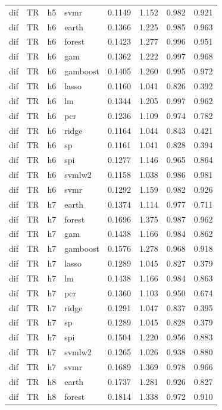 \begin{ThreePartTable}
\begin{longtable}[t]{llclcccc}
dif & TR & h5 & svmr & 0.1149 & 1.152 & 0.982 & 0.921\\
\addlinespace
dif & TR & h6 & earth & 0.1366 & 1.225 & 0.985 & 0.963\\
dif & TR & h6 & forest & 0.1423 & 1.277 & 0.996 & 0.951\\
dif & TR & h6 & gam & 0.1362 & 1.222 & 0.997 & 0.968\\
dif & TR & h6 & gamboost & 0.1405 & 1.260 & 0.995 & 0.972\\
dif & TR & h6 & lasso & 0.1160 & 1.041 & 0.826 & 0.392\\
dif & TR & h6 & lm & 0.1344 & 1.205 & 0.997 & 0.962\\
dif & TR & h6 & pcr & 0.1236 & 1.109 & 0.974 & 0.782\\
dif & TR & h6 & ridge & 0.1164 & 1.044 & 0.843 & 0.421\\
dif & TR & h6 & sp & 0.1161 & 1.041 & 0.828 & 0.394\\
dif & TR & h6 & spi & 0.1277 & 1.146 & 0.965 & 0.864\\
dif & TR & h6 & svmlw2 & 0.1158 & 1.038 & 0.986 & 0.981\\
dif & TR & h6 & svmr & 0.1292 & 1.159 & 0.982 & 0.926\\
\addlinespace
dif & TR & h7 & earth & 0.1374 & 1.114 & 0.977 & 0.711\\
dif & TR & h7 & forest & 0.1696 & 1.375 & 0.987 & 0.962\\
dif & TR & h7 & gam & 0.1438 & 1.166 & 0.984 & 0.862\\
dif & TR & h7 & gamboost & 0.1576 & 1.278 & 0.968 & 0.918\\
dif & TR & h7 & lasso & 0.1289 & 1.045 & 0.827 & 0.379\\
dif & TR & h7 & lm & 0.1438 & 1.166 & 0.984 & 0.863\\
dif & TR & h7 & pcr & 0.1360 & 1.103 & 0.950 & 0.674\\
dif & TR & h7 & ridge & 0.1291 & 1.047 & 0.837 & 0.395\\
dif & TR & h7 & sp & 0.1289 & 1.045 & 0.828 & 0.379\\
dif & TR & h7 & spi & 0.1504 & 1.220 & 0.956 & 0.883\\
dif & TR & h7 & svmlw2 & 0.1265 & 1.026 & 0.938 & 0.880\\
dif & TR & h7 & svmr & 0.1689 & 1.369 & 0.978 & 0.966\\
\addlinespace
dif & TR & h8 & earth & 0.1737 & 1.281 & 0.926 & 0.827\\
dif & TR & h8 & forest & 0.1814 & 1.338 & 0.972 & 0.910\\

\end{longtable}
\end{ThreePartTable}
